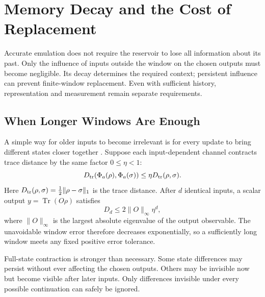 \section{Memory Decay and the Cost of Replacement}
\label{sec:dynamics}

Accurate emulation does not require the reservoir to lose all information
about its past. Only the influence of inputs outside the window on the
chosen outputs must become negligible. Its decay determines the required
context; persistent influence can prevent finite-window replacement.
Even with sufficient history, representation and measurement remain
separate requirements.

\subsection{When Longer Windows Are Enough}
\label{sec:observable-forgetting}

A simple way for older inputs to become irrelevant is for every update to
bring different states closer together \cite{chen2020temporal}. Suppose
each input-dependent channel contracts trace distance by the same factor
$0\leq\eta<1$:
\begin{equation}
 D_{\rm tr}(\Phi_a(\rho),\Phi_a(\sigma))
 \leq\eta D_{\rm tr}(\rho,\sigma).
 \label{eq:incremental-channel}
\end{equation}
Here $D_{\rm tr}(\rho,\sigma)=\tfrac12\|\rho-\sigma\|_1$ is the trace
distance. After $d$ identical inputs, a scalar output
$y=\operatorname{Tr}(O\rho)$ satisfies
\begin{equation}
 D_d\leq 2\|O\|_\infty\eta^d,
 \label{eq:contraction-bound}
\end{equation}
where $\|O\|_\infty$ is the largest absolute eigenvalue of the output
observable. The unavoidable window error therefore decreases exponentially,
so a sufficiently long window meets any fixed positive error tolerance.

Full-state contraction is stronger than necessary. Some state differences
may persist without ever affecting the chosen outputs. Others may be
invisible now but become visible after later inputs. Only differences
invisible under every possible continuation can safely be ignored.

